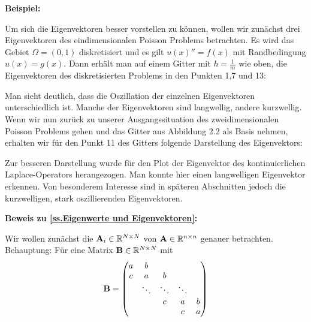 \textbf{Beispiel:}

Um sich die Eigenvektoren besser vorstellen zu können, wollen wir zunächst drei Eigenvektoren des eindimensionalen Poisson Problems betrachten. Es wird das Gebiet $\Omega = (0,1)$ diskretisiert und es gilt $u(x)'' = f(x)$ mit Randbedingung $u(x) = g(x)$. Dann erhält man auf einem Gitter mit $h = \frac{1}{m}$ wie oben, die Eigenvektoren des diskretisierten Problems in den Punkten 1,7 und 13:


Man sieht deutlich, dass die Oszillation der einzelnen Eigenvektoren unterschiedlich ist. Manche der Eigenvektoren sind langwellig, andere kurzwellig. Wenn wir nun zurück zu unserer Ausgangssituation des zweidimensionalen Poisson Problems gehen und das Gitter aus Abbildung 2.2 als Basis nehmen, erhalten wir für den Punkt 11 des Gitters folgende Darstellung des Eigenvektors:


Zur besseren Darstellung wurde für den Plot der Eigenvektor des kontinuierlichen Laplace-Operators herangezogen. Man konnte hier einen langwelligen Eigenvektor erkennen. Von besonderem Interesse sind in späteren Abschnitten jedoch die kurzwelligen, stark oszillierenden Eigenvektoren.

\textbf{Beweis zu \autoref{ss.Eigenwerte und Eigenvektoren}:}

Wir wollen zunächst die ${\textbf{A}}_{i} \in \mathbb{R}^{N \times N}$ von ${\textbf{A}} \in \mathbb{R}^{n \times n}$ genauer betrachten.\\
Behauptung: Für eine Matrix ${\textbf{B}} \in \mathbb{R}^{N \times N}$ mit
\begin{equation}
{\textbf{B}} = 
\begin{pmatrix}
a & b\\
c & a & b\\
  & \ddots & \ddots & \ddots\\
  &		   & c & a & b\\
  &		   &  & c & a
\end{pmatrix}
\end{equation}

